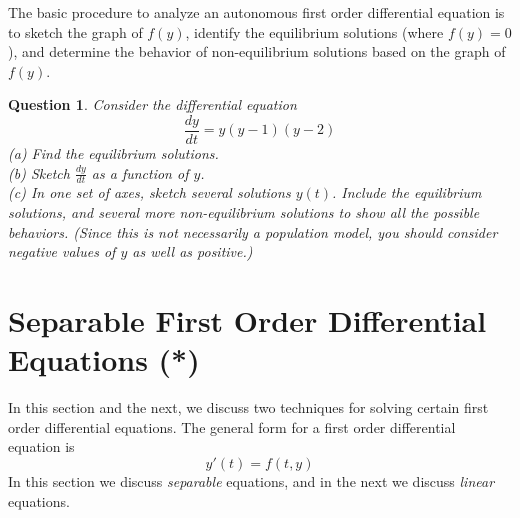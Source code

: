 \documentclass[reqno]{immbook}
\newtheorem{question}{Question}
\begin{document}
The basic procedure to analyze an autonomous
first order differential equation is to sketch the graph of $f(y)$, identify
the equilibrium solutions (where $f(y)=0$), and determine the
behavior of non-equilibrium solutions based on the graph
of $f(y)$.

\begin{question}
Consider the differential equation
\[
   \frac{dy}{dt} = y(y-1)(y-2)
\]
(a) Find the equilibrium solutions.\\
(b) Sketch $\frac{dy}{dt}$ as a function of $y$.\\
(c) In one set of axes, sketch several solutions $y(t)$. Include the equilibrium solutions,
and several more non-equilibrium solutions to show all the possible behaviors.
(Since this is not necessarily a population model, you should consider negative values
of $y$ as well as positive.)
\end{question}



\section{Separable First Order Differential Equations (*)}

In this section and the next, we discuss
two techniques for solving certain first order
differential equations.
The general form for a first order differential equation is
\begin{equation}
   y'(t) = f(t,y)
\end{equation}
In this section we discuss \emph{separable} equations,
and in the next we discuss \emph{linear} equations.
\end{document}
